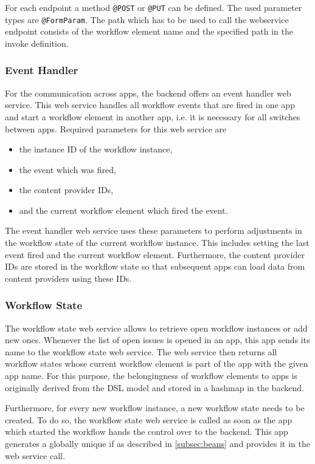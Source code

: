 For each endpoint a method \lstinline|@POST| or \lstinline|@PUT| can be defined. The used parameter types are \lstinline|@FormParam|. The path which has to be used to call the webservice endpoint consists of the workflow element name and the specified path in the invoke definition.

\subsubsection{Event Handler} 

For the communication across apps, the backend offers an event handler web service. This web service handles all workflow events that are fired in one app and start a workflow element in another app, i.e. it is necessary for all switches between apps. Required parameters for this web service are

\begin{itemize}
\item the instance ID of the workflow instance,
\item the event which was fired,
\item the content provider IDs,
\item and the current workflow element which fired the event.
\end{itemize}

The event handler web service uses these parameters to perform adjustments in the workflow state of the current workflow instance. This includes setting the last event fired and the current workflow element. Furthermore, the content provider IDs are stored in the workflow state so that subsequent apps can load data from content providers using these IDs.

\subsubsection{Workflow State} 

The workflow state web service allows to retrieve open workflow instances or add new ones. Whenever the list of open issues is opened in an app, this app sends its name to the workflow state web service. The web service then returns all workflow states whose current workflow element is part of the app with the given app name. For this purpose, the belongingness of workflow elements to apps is originally derived from the DSL model and stored in a hashmap in the backend.

Furthermore, for every new workflow instance, a new workflow state needs to be created. To do so, the workflow state web service is called as soon as the app which started the workflow hands the control over to the backend. This app generates a globally unique if as described in \ref{subsec:beans} and provides it in the web service call.

